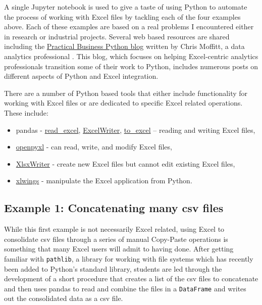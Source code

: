 \documentclass[ited,blindrev]{informs3}              %
\newcommand{\code}[1]{\texttt{#1}}
\begin{document}
A single Jupyter notebook is used to give a taste of using Python to automate the process of working with Excel files by tackling each of the four examples above. Each of these examples are based on a real problems I encountered either in research or industrial projects. Several web based resources are shared including the \href{https://pbpython.com/}{Practical Business Python blog} written by Chris Moffitt, a data analytics professional \citep{moffittPracticalBusinessPython2022}. This blog, which focuses on helping Excel-centric analytics professionals transition some of their work to Python, includes numerous posts on different aspects of Python and Excel integration.  

There are a number of Python based tools that either include functionality for working with Excel files or are dedicated to specific Excel related operations. These include:

\begin{itemize}
	\item
	pandas -
	\href{https://pandas.pydata.org/docs/reference/api/pandas.read_excel.html}{read\_excel},
	\href{https://pandas.pydata.org/docs/reference/api/pandas.ExcelWriter.html}{ExcelWriter},
	\href{https://pandas.pydata.org/docs/reference/api/pandas.DataFrame.to_excel.html}{to\_excel} -- reading and writing Excel files,
	\item
	\href{https://openpyxl.readthedocs.io/en/stable/}{openpyxl} - can
	read, write, and modify Excel files,
	\item
	\href{https://xlsxwriter.readthedocs.io/}{XlsxWriter} - create new Excel files but
	cannot edit existing Excel files,
	\item
	\href{https://www.xlwings.org/}{xlwings} - manipulate the Excel application from Python.
\end{itemize}


\subsection{Example 1: Concatenating many csv files}

While this first example is not necessarily Excel related, using Excel to consolidate csv files through a series of manual Copy-Paste operations is something that many Excel users will admit to having done. After getting familiar with \code{pathlib}, a library for working with file systems which has recently been added to Python's standard library, students are led through the development of a short procedure that creates a list of the csv files to concatenate and then uses pandas to read and combine the files in a \code{DataFrame} and writes out the consolidated data as a csv file.
\end{document}
